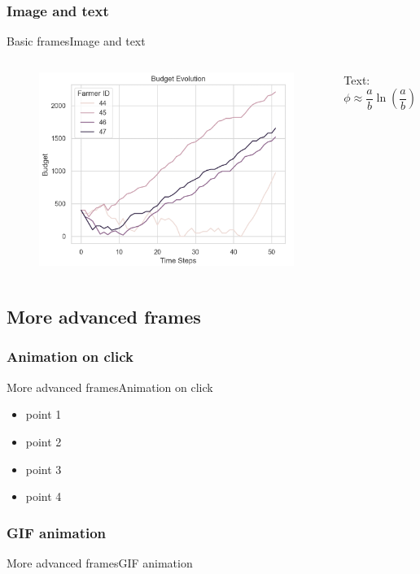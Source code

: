 \documentclass[10pt, aspectratio=169]{beamer}
\def\aa{Basic frames}
\def\aac{Image and text}
\def\ab{More advanced frames}
\def\aba{Animation on click}
\def\abb{GIF animation}
\begin{document}
\subsubsection{\aac}
\begin{frame}{\aa}{\aac}
    \begin{columns}
         \centering
         \begin{figure}
          \includegraphics[scale=0.30]{Figures/v12_Budget.png}
         \end{figure}
       Text:
       \begin{equation}
        \phi \approx \frac{a}{b} \ln \left( \frac{a}{b} \right)
      \end{equation}
     \end{columns} 
\end{frame}

\subsection{\ab}

\subsubsection{\aba}
\begin{frame}{\ab}{\aba}
    \begin{itemize}
        \item<1-> point 1
        \item<2-> point 2
        \item<3-> point 3
        \item<4-> point 4
    \end{itemize}
\end{frame}

\subsubsection{\abb}
\begin{frame}{\ab}{\abb}
    \centering
\end{frame}
\end{document}
